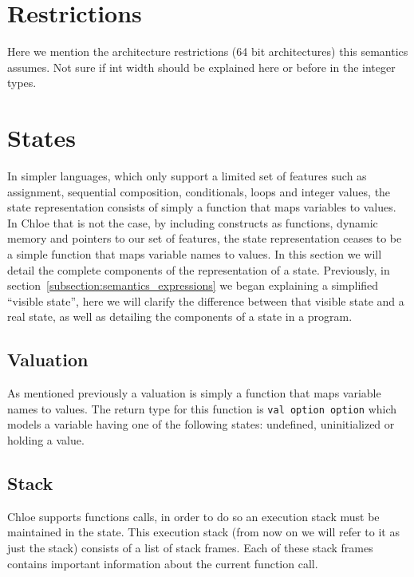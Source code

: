 \section{Restrictions}\label{subsection:restrictions_commands}
Here we mention the architecture restrictions (64 bit architectures) this semantics assumes.
Not sure if int width should be explained here or before in the integer types.


\section{States}\label{section:states}

In simpler languages, which only support a limited set of features such as assignment, sequential composition, conditionals, loops and integer values, the state representation consists of simply a function that maps variables to values.
In Chloe that is not the case, by including constructs as functions, dynamic memory and pointers to our set of features, the state representation ceases to be a simple function that maps variable names to values.
In this section we will detail the complete components of the representation of a state.
Previously, in section~\ref{subsection:semantics_expressions} we began explaining a simplified ``visible state'', here we will clarify the difference between that visible state and a real state, as well as detailing the components of a state in a program.

\subsection{Valuation}\label{subsection:valuation}

As mentioned previously a valuation is simply a function that maps variable names to values.
The return type for this function is \verb|val option option| which models a variable having one of the following states: undefined, uninitialized or holding a value.


\subsection{Stack}\label{subsection:stack}

Chloe supports functions calls, in order to do so an execution stack must be maintained in the state.
This execution stack (from now on we will refer to it as just the stack) consists of a list of stack frames.
Each of these stack frames contains important information about the current function call.

